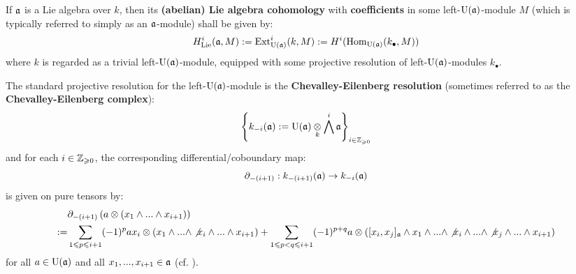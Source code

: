         \begin{definition} \label{def: lie_algebra_cohomology}
            If $\mathfrak{a}$ is a Lie algebra over $k$, then its \textbf{(abelian) Lie algebra cohomology} with \textbf{coefficients} in some left-$\mathrm{U}(\mathfrak{a})$-module $M$ (which is typically referred to simply as an $\mathfrak{a}$-module) shall be given by:
                $$H^i_{\mathrm{Lie}}(\mathfrak{a}, M) := \mathrm{Ext}^i_{\mathrm{U}(\mathfrak{a})}(k, M) := H^i( \mathrm{Hom}_{\mathrm{U}(\mathfrak{a})}(k_{\bullet}, M) )$$
            where $k$ is regarded as a trivial left-$\mathrm{U}(\mathfrak{a})$-module, equipped with some projective resolution of left-$\mathrm{U}(\mathfrak{a})$-modules $k_{\bullet}$.

            The standard projective resolution for the left-$\mathrm{U}(\mathfrak{a})$-module is the \textbf{Chevalley-Eilenberg resolution} (sometimes referred to as the \textbf{Chevalley-Eilenberg complex}):
                $$\left\{ k_{-i}(\a) := \rmU(\a) \tensor_k \bigwedge^i \a \right\}_{i \in \Z_{\geq 0}}$$
            and for each $i \in \mathbb{Z}_{\geqslant 0}$, the corresponding differential/coboundary map:
                $$\partial_{-(i + 1)}: k_{-(i + 1)}(\mathfrak{a}) \to k_{-i}(\mathfrak{a})$$
            is given on pure tensors by:
                $$
                    \begin{aligned}
                        & \del_{-(i + 1)}\left( a \tensor (x_1 \wedge ... \wedge x_{i + 1}) \right)
                        \\
                        := & \sum_{1 \leq p \leq i + 1} (-1)^p a x_i \tensor (x_1 \wedge ... \wedge \not{x_i} \wedge ... \wedge x_{i + 1}) + \sum_{1 \leq p < q \leq i + 1} (-1)^{p + q} a \tensor ( [x_i, x_j]_{\a} \wedge x_1 \wedge ... \wedge \not{x_i} \wedge ... \wedge \not{x_j} \wedge ... \wedge x_{i + 1})
                    \end{aligned}
                $$
            for all $a \in \mathrm{U}(\mathfrak{a})$ and all $x_1, ..., x_{i + 1} \in \mathfrak{a}$ (cf. \cite[Section VII.4]{hilton_stammbach_homological_algebra}).
        \end{definition}
